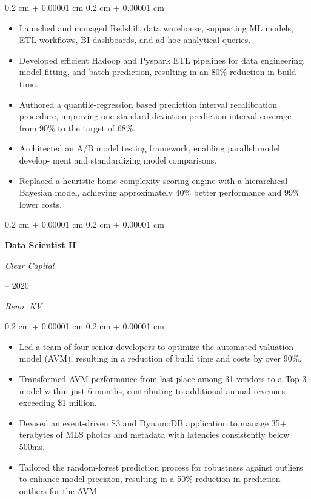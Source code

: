 \documentclass[11pt, letterpaper]{article}
\newenvironment{highlights}{
    \begin{itemize}[
        topsep=0.10 cm,
        parsep=0.10 cm,
        partopsep=0pt,
        itemsep=0pt,
        leftmargin=0.4 cm + 10pt
    ]
}{
    \end{itemize}
} %
\newenvironment{onecolentry}{
    \begin{adjustwidth}{
        0.2 cm + 0.00001 cm
    }{
        0.2 cm + 0.00001 cm
    }
}{
    \end{adjustwidth}
} %
\newenvironment{twocolentry}[2][]{
    \onecolentry
    \def\secondColumn{#2}
    \setcolumnwidth{\fill, 4.5 cm}
    \begin{paracol}{2}
}{
    \switchcolumn \raggedleft \secondColumn
    \end{paracol}
    \endonecolentry
} %
\begin{document}
\begin{onecolentry}
    \begin{highlights}

        \item Launched and managed Redshift data warehouse, supporting ML models, ETL
        workﬂows, BI dashboards, and ad-hoc analytical queries.
        \item Developed eﬃcient Hadoop and Pyspark ETL pipelines for data engineering,
        model ﬁtting, and batch prediction, resulting in an 80\% reduction in build time.
        \item Authored a quantile-regression based prediction interval recalibration procedure, improving
        one standard deviation prediction interval coverage from 90\% to the target of 68\%.
        \item Architected an A/B model testing framework, enabling parallel model develop-
        ment and standardizing model comparisons.
        \item Replaced a heuristic home complexity scoring engine with a hierarchical Bayesian model,
        achieving approximately 40\% better performance and 99\% lower costs.

    \end{highlights}
\end{onecolentry}

\vspace{0.2 cm}
\begin{twocolentry}{
        2017 – 2020

        \textit{Reno, NV}
    }
    \textbf{Data Scientist II}

    \textit{Clear Capital}
\end{twocolentry}

\begin{onecolentry}
    \begin{highlights}

        \item Led a team of four senior developers to optimize the automated valuation
        model (AVM), resulting in a reduction of build time and costs by over 90\%.
        \item  Transformed AVM performance from last place among 31 vendors to a Top
        3 model within just 6 months, contributing to additional annual revenues
        exceeding \$1 million.
        \item Devised an event-driven S3 and DynamoDB application to manage 35+ terabytes
        of MLS photos and metadata with latencies consistently below 500ms.
        \item Tailored the random-forest prediction process for robustness against outliers to
        enhance model precision, resulting in a 50\% reduction in prediction outliers for the AVM.

    \end{highlights}
\end{onecolentry}
\end{document}
